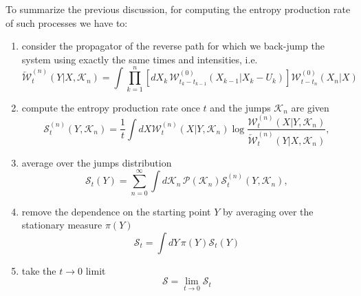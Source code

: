\documentclass[12pt]{iopart}
\newcommand{\lx} {\left}
\newcommand{\rx} {\right}
\newcommand{\cP} {\mathcal{P}}
\newcommand{\cW} {\mathcal{W}}
\newcommand{\cS} {\mathcal{S}}
\newcommand{\cK} {\mathcal{K}}
\begin{document}
To summarize the previous discussion, for computing the entropy production rate of such processes we have to:
\begin{enumerate}
\item consider the propagator of the reverse path for which we back-jump the system using exactly the same times and intensities, i.e.
\begin{equation}
\overleftarrow{\cW}^{(n)}_t(Y|X,\cK_n) = \int \prod_{k=1}^n \lx[ dX_k \, \cW^{(0)}_{t_k - t_{k-1}}( X_{k-1}|X_k-U_k ) \rx] \cW^{(0)}_{t-t_n}(X_n|X)
\end{equation}
\item compute the entropy production rate once $t$ and the jumps $\cK_n$ are given
\begin{equation}
\cS^{(n)}_t(Y,\cK_n) = \frac{1}{t} \int dX \cW^{(n)}_t(X|Y,\cK_n) \log\frac{\cW^{(n)}_t(X|Y,\cK_n)}{\overleftarrow{\cW}^{(n)}_t(Y|X,\cK_n)},
\end{equation}
\item average over the jumps distribution
\begin{equation}
\cS_t(Y) = \sum_{n=0}^\infty \int d\cK_n\, \cP(\cK_n) \cS^{(n)}_t(Y,\cK_n),
\end{equation}
\item remove the dependence on the starting point $Y$ by averaging over the stationary measure $\pi(Y)$
\begin{equation}
\cS_t = \int dY\, \pi(Y) \cS_t(Y)
\end{equation}
\item take the $t\to 0$ limit
\begin{equation}
\cS = \lim_{t\to0} \cS_t
\end{equation}
\end{enumerate}
\end{document}
